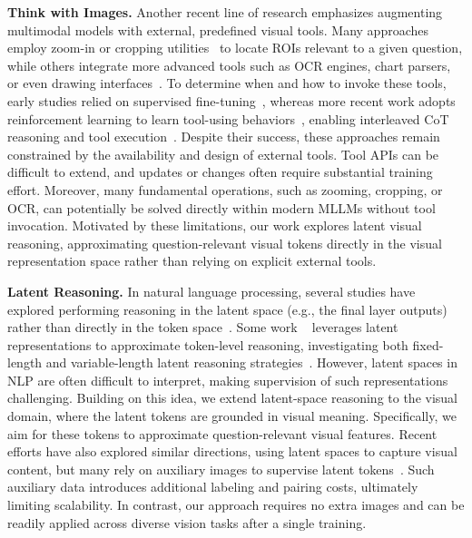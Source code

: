 \textbf{Think with Images.} Another recent line of research emphasizes augmenting multimodal models with external, predefined visual tools. Many approaches employ zoom-in or cropping utilities~\citep{su2025pixel,zhang2025chain} to locate ROIs relevant to a given question, while others integrate more advanced tools such as OCR engines, chart parsers, or even drawing interfaces~\citep{huang2025visualtoolagent}. To determine when and how to invoke these tools, early studies relied on supervised fine-tuning~\citep{wang2025vgr,zhang2025cmmcot,chung2025don}, whereas more recent work adopts reinforcement learning to learn tool-using behaviors~\citep{zhang2025chain,su2025openthinkimg,geng2025webwatcher,wu2025reinforcing}, enabling interleaved CoT reasoning and tool execution~\citep{wu2025vtool,zheng2025deepeyes}. Despite their success, these approaches remain constrained by the availability and design of external tools. Tool APIs can be difficult to extend, and updates or changes often require substantial training effort. Moreover, many fundamental operations, such as zooming, cropping, or OCR, can potentially be solved directly within modern MLLMs without tool invocation. Motivated by these limitations, our work explores latent visual reasoning, approximating question-relevant visual tokens directly in the visual representation space rather than relying on explicit external tools.


\textbf{Latent Reasoning.} In natural language processing, several studies have explored performing reasoning in the latent space (e.g., the final layer outputs) rather than directly in the token space~\citep{coconut}. Some work ~\citep{shen2025codi} leverages latent representations to approximate token-level reasoning, investigating both fixed-length and variable-length latent reasoning strategies~\citep{cheng2024compressed}. However, latent spaces in NLP are often difficult to interpret, making supervision of such representations challenging. Building on this idea, we extend latent-space reasoning to the visual domain, where the latent tokens are grounded in visual meaning. Specifically, we aim for these tokens to approximate question-relevant visual features. Recent efforts have also explored similar directions, using latent spaces to capture visual content, but many rely on auxiliary images to supervise latent tokens~\citep{mirage,bigverdi2025perception}. Such auxiliary data introduces additional labeling and pairing costs, ultimately limiting scalability. In contrast, our approach requires no extra images and can be readily applied across diverse vision tasks after a single training.

